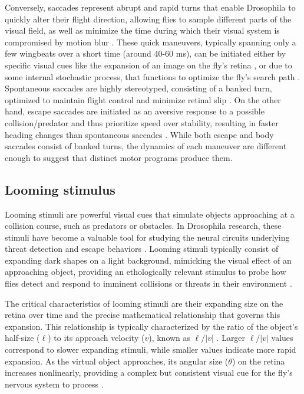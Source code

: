 \documentclass[../main/thesis_msc.tex]{subfiles}
\begin{document}
	Conversely, saccades represent abrupt and rapid turns that enable Drosophila to quickly alter their flight direction, allowing flies to sample different parts of the visual field, as well as minimize the time during which their visual system is compromised by motion blur \autocite{muijres_body_2015,reichardt1976visual, tammero_collision-avoidance_2002,wagner_flight_1997,wehrhahn_tracking_1982}. These quick maneuvers, typically spanning only a few wingbeats over a short time (around 40-60 ms), can be initiated either by specific visual cues like the expansion of an image on the fly's retina \autocite{censi_discriminating_2013,reiser_visual_2013, stewart_model_2010, tammero_collision-avoidance_2002}, or due to some internal stochastic process, that functions to optimize the fly’s search path \autocite{maye_order_2007,mongeau_drosophila_2017, reynolds_free-flight_2007}. Spontaneous saccades are highly stereotyped, consisting of a banked turn, optimized to maintain flight control and minimize retinal slip \autocite{muijres_body_2015}. On the other hand, escape saccades are initiated as an aversive response to a possible collision/predator and thus prioritize speed over stability, resulting in faster heading changes than spontaneous saccades \autocite{muijres_flies_2014}. While both escape and body saccades consist of banked turns, the dynamics of each maneuver are different enough to suggest that distinct motor programs produce them.

	\subsection{Looming stimulus}

	Looming stimuli are powerful visual cues that simulate objects approaching at a collision course, such as predators or obstacles. In Drosophila research, these stimuli have become a valuable tool for studying the neural circuits underlying threat detection and escape behaviors \autocite{devries_loom-sensitive_2012, fotowat_novel_2009}. Looming stimuli typically consist of expanding dark shapes on a light background, mimicking the visual effect of an approaching object, providing an ethologically relevant stimulus to probe how flies detect and respond to imminent collisions or threats in their environment \autocite{card_performance_2008, fotowat_novel_2009}.

	The critical characteristics of looming stimuli are their expanding size on the retina over time and the precise mathematical relationship that governs this expansion. This relationship is typically characterized by the ratio of the object's half-size ($\ell$) to its approach velocity ($v$), known as $\ell/|v|$ \autocite{fotowat_novel_2009, gabbiani_invariance_2001}. Larger $\ell/|v|$ values correspond to slower expanding stimuli, while smaller values indicate more rapid expansion. As the virtual object approaches, its angular size ($\theta$) on the retina increases nonlinearly, providing a complex but consistent visual cue for the fly's nervous system to process \autocite{devries_loom-sensitive_2012}.
\end{document}
